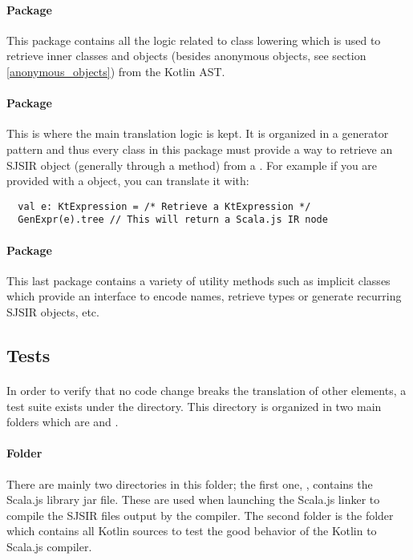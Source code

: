 \paragraph{Package } This package contains all the logic related to class 
lowering which is used to retrieve inner classes and objects (besides anonymous objects, see 
section \ref{anonymous_objects}) from the Kotlin AST.

\paragraph{Package } This is where the main translation logic is kept. 
It is organized in a generator pattern and thus every class in this package must provide a way to 
retrieve an SJSIR object (generally through a  method) from a . 
For example if you are provided with a  object, you can translate it with:

\begin{verbatim}
  val e: KtExpression = /* Retrieve a KtExpression */
  GenExpr(e).tree // This will return a Scala.js IR node
\end{verbatim}


\paragraph{Package } This last package contains a variety of utility 
methods such as implicit classes which provide an interface to encode names, retrieve types or 
generate recurring SJSIR objects, etc.

\subsection*{Tests}
\paragraph{} In order to verify that no code change breaks the translation of other elements, a 
test suite exists under the  directory. This directory is organized in two main 
folders which are  and .

\paragraph{Folder } There are mainly two directories in this folder; the 
first one, , contains the Scala.js library jar file. These are used when launching 
the Scala.js linker to compile the SJSIR files output by the compiler. The second folder is the 
 folder which contains all Kotlin sources to test the good behavior of the 
Kotlin to Scala.js compiler.

